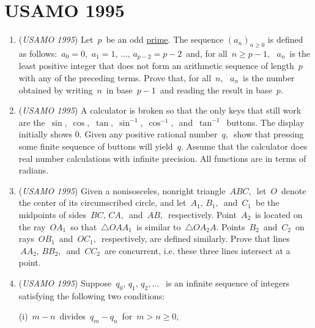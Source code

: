 \section{USAMO 1995}
        \begin{enumerate}
        	\item (\textit{USAMO 1995}) Let $\, p \,$ be an odd \href{https://artofproblemsolving.com/wiki/index.php?title=Prime}{prime}.  The sequence $(a_n)_{n \geq 0}$ is defined as follows: $\, a_0 = 0,$ $a_1 = 1, \, \ldots, \, a_{p-2} = p-2 \,$ and, for all $\, n \geq p-1, \,$ $\, a_n \,$ is the least positive integer that does not form an arithmetic sequence of length $\, p \,$ with any of the preceding terms. Prove that, for all $\, n, \,$ $\, a_n \,$ is the number obtained by writing $\, n \,$ in base $\, p-1 \,$ and reading the result in base $\, p$.


 

	\item (\textit{USAMO 1995}) A calculator is broken so that the only keys that still work are the $\, \sin, \; \cos,$ $\tan, \; \sin^{-1}, \; \cos^{-1}, \,$ and $\, \tan^{-1} \,$ buttons.  The display initially shows 0. Given any positive rational number $\, q, \,$ show that pressing some finite sequence of buttons will yield $\, q$.   Assume that the calculator does real number calculations with infinite precision.  All functions are in terms of radians.


 

	\item (\textit{USAMO 1995}) Given a nonisosceles, nonright triangle $\, ABC, \,$ let $\, O \,$ denote the center of its circumscribed circle, and let $\, A_1, \, B_1, \,$ and $\, C_1 \,$ be the midpoints of sides $\, BC, \, CA, \,$ and $\, AB, \,$ respectively.  Point $\, A_2 \,$ is located on the ray $\, OA_1 \,$ so that $\, \triangle OAA_1 \,$ is similar to $\, \triangle OA_2A$.  Points $\, B_2 \,$ and $\, C_2 \,$ on rays $\, OB_1 \,$ and $\, OC_1, \,$ respectively, are defined similarly.  Prove that lines $\, AA_2, \, BB_2, \,$ and $\, CC_2 \,$ are concurrent, i.e. these three lines intersect at a point.


 

	\item (\textit{USAMO 1995}) Suppose $\, q_0, \, q_1, \,  q_2, \ldots \; \,$ is an infinite sequence of integers satisfying the following two conditions:

(i)  $\, m-n \,$ divides $\, q_m - q_n \,$ for $\, m > n \geq 0,$ 


\end{enumerate}
